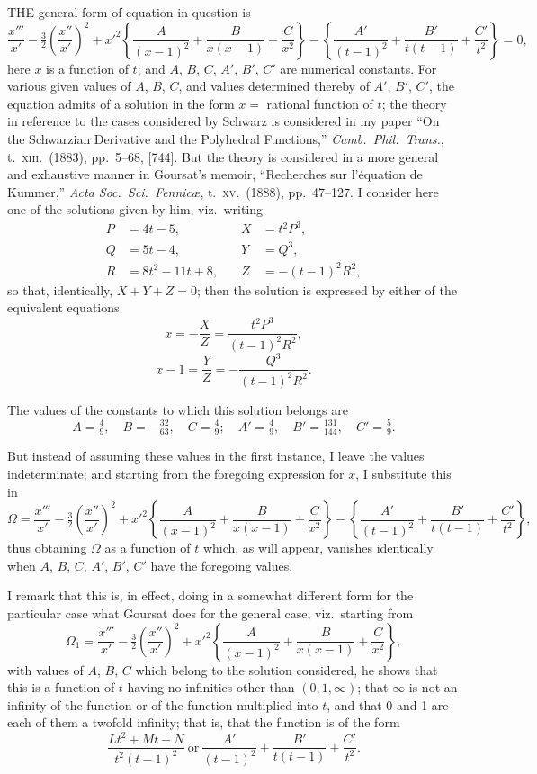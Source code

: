 \documentclass[11pt,a4paper]{article}
\begin{document}
\noindent THE general form of equation in question is
\[
\frac{x'''}{x'} - \tfrac{3}{2}\left(\frac{x''}{x'}\right)^2 + x'^2\left\{\frac{A}{(x - 1)^2} + \frac{B}{x(x - 1)} + \frac{C}{x^2}\right\} - \left\{\frac{A'}{(t - 1)^2} + \frac{B'}{t(t - 1)} + \frac{C'}{t^2}\right\} = 0,
\]
here $x$ is a function of $t$; and $A$, $B$, $C$, $A'$, $B'$, $C'$ are numerical constants. For various given values of $A$, $B$, $C$, and values determined thereby of $A'$, $B'$, $C'$, the equation admits of a solution in the form $x = $ rational function of $t$; the theory in reference to the cases considered by Schwarz is considered in my paper ``On the Schwarzian Derivative and the Polyhedral Functions,'' \emph{Camb.\ Phil.\ Trans.}, t.\ \textsc{xiii}.\ (1883), pp.\ 5--68, [744]. But the theory is considered in a more general and exhaustive manner in Goursat's memoir, ``Recherches sur l'équation de Kummer,'' \emph{Acta Soc.\ Sci.\ Fennic\ae}, t.\ \textsc{xv}.\ (1888), pp.\ 47--127. I consider here one of the solutions given by him, viz.\ writing
\begin{align*}
P &= 4t - 5,\quad & X &= t^2 P^3,\\
Q &= 5t - 4,\quad & Y &= Q^3,\\
R &= 8t^2 - 11t + 8,\quad & Z &= - (t - 1)^2 R^2,
\end{align*}
so that, identically, $X + Y + Z = 0$; then the solution is expressed by either of the equivalent equations
\[
x = - \frac{X}{Z} = \frac{t^2 P^3}{(t - 1)^2 R^2},
\]
\[
x - 1 = \frac{Y}{Z} = - \frac{Q^3}{(t - 1)^2 R^2}.
\]

The values of the constants to which this solution belongs are
\[
A = \tfrac{4}{9},\quad B = - \tfrac{32}{63},\quad C = \tfrac{4}{9};\quad A' = \tfrac{4}{9},\quad B' = \tfrac{131}{144},\quad C' = \tfrac{5}{9}.
\]

But instead of assuming these values in the first instance, I leave the values indeterminate; and starting from the foregoing expression for $x$, I substitute this in
\[
\Omega = \frac{x'''}{x'} - \tfrac{3}{2}\!\left(\frac{x''}{x'}\right)^2 + x'^2\!\left\{\frac{A}{(x - 1)^2} + \frac{B}{x(x - 1)} + \frac{C}{x^2}\right\} - \left\{\frac{A'}{(t - 1)^2} + \frac{B'}{t(t - 1)} + \frac{C'}{t^2}\right\},
\]
thus obtaining $\Omega$ as a function of $t$ which, as will appear, vanishes identically when $A$, $B$, $C$, $A'$, $B'$, $C'$ have the foregoing values.

I remark that this is, in effect, doing in a somewhat different form for the particular case what Goursat does for the general case, viz.\ starting from
\[
\Omega_1 = \frac{x'''}{x'} - \tfrac{3}{2}\!\left(\frac{x''}{x'}\right)^2 + x'^2\!\left\{\frac{A}{(x - 1)^2} + \frac{B}{x(x - 1)} + \frac{C}{x^2}\right\},
\]
with values of $A$, $B$, $C$ which belong to the solution considered, he shows that this is a function of $t$ having no infinities other than $(0, 1, \infty)$; that $\infty$ is not an infinity of the function or of the function multiplied into $t$, and that 0 and 1 are each of them a twofold infinity; that is, that the function is of the form
\[
\frac{L t^2 + M t + N}{t^2 (t - 1)^2}\ \text{or}\ \frac{A'}{(t - 1)^2} + \frac{B'}{t(t - 1)} + \frac{C'}{t^2}.
\]
\end{document}
